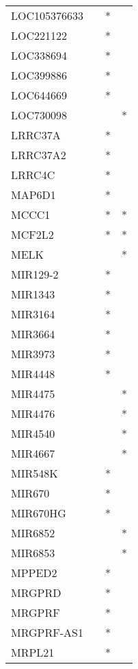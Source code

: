 \begin{longtable}{lccc}
LOC105376633  &       &  * &         \\
LOC221122     &       &  * &         \\
LOC338694     &       &  * &         \\
LOC399886     &       &  * &         \\
LOC644669     &       &  * &         \\
LOC730098     &       &    &       * \\
LRRC37A       &       &  * &         \\
LRRC37A2      &       &  * &         \\
LRRC4C        &       &  * &         \\
MAP6D1        &       &  * &         \\
MCCC1         &       &  * &       * \\
MCF2L2        &       &  * &       * \\
MELK          &       &    &       * \\
MIR129-2      &       &  * &         \\
MIR1343       &       &  * &         \\
MIR3164       &       &  * &         \\
MIR3664       &       &  * &         \\
MIR3973       &       &  * &         \\
MIR4448       &       &  * &         \\
MIR4475       &       &    &       * \\
MIR4476       &       &    &       * \\
MIR4540       &       &    &       * \\
MIR4667       &       &    &       * \\
MIR548K       &       &  * &         \\
MIR670        &       &  * &         \\
MIR670HG      &       &  * &         \\
MIR6852       &       &    &       * \\
MIR6853       &       &    &       * \\
MPPED2        &       &  * &         \\
MRGPRD        &       &  * &         \\
MRGPRF        &       &  * &         \\
MRGPRF-AS1    &       &  * &         \\
MRPL21        &       &  * &         \\

\end{longtable}
